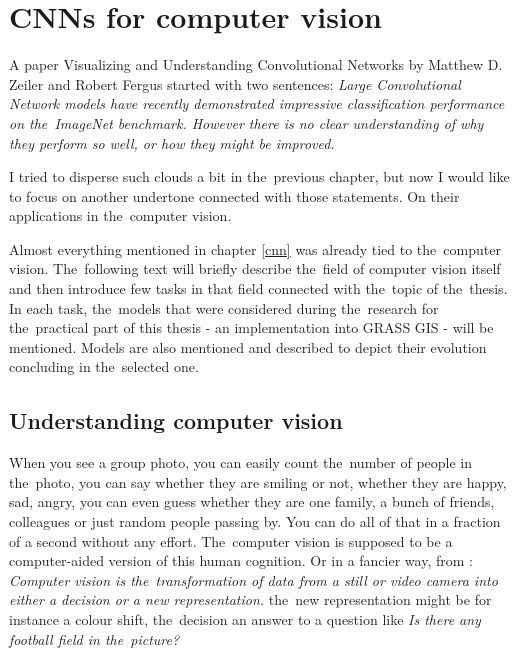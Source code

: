 \chapter{CNNs for computer vision}
\label{image-ann}

A paper Visualizing and Understanding Convolutional Networks by Matthew D. 
Zeiler and Robert Fergus \cite{zf-net} started with two sentences: \textit{Large 
Convolutional Network models have recently demonstrated impressive 
classification performance on the~ImageNet benchmark. However there is no clear 
understanding of why they perform so well, or how they might be improved.}

I tried to disperse such clouds a bit in the~previous chapter, but now I would 
like to focus on another undertone connected with those statements. On their 
applications in the~computer vision.

Almost everything mentioned in chapter \ref{cnn} was already tied to
the~computer vision. The~following text will briefly describe the~field of computer 
vision itself and then introduce few tasks in that field connected with
the~topic of the~thesis. In each task, the~models that were considered during
the~research for the~practical part of this thesis - an implementation into GRASS 
GIS - will be mentioned. Models are also mentioned and described to depict their
evolution concluding in the~selected one.


\section{Understanding computer vision}
\label{computer-vision}

When you see a group photo, you can easily count the~number of people in
the~photo, you can say whether they are smiling or not, whether they are happy, sad, 
angry, you can even guess whether they are one family, a bunch of friends, 
colleagues or just random people passing by. You can do all of that in a 
fraction of a second without any effort. The~computer vision is supposed to be a 
computer-aided version of this human cognition. Or in a fancier way, from 
\cite{opencv}: \textit{Computer vision is the~transformation of data from a 
still or video camera into either a decision or a new representation.} the~new 
representation might be for instance a colour shift, the~decision an answer to a 
question like \textit{Is there any football field in the~picture?}


